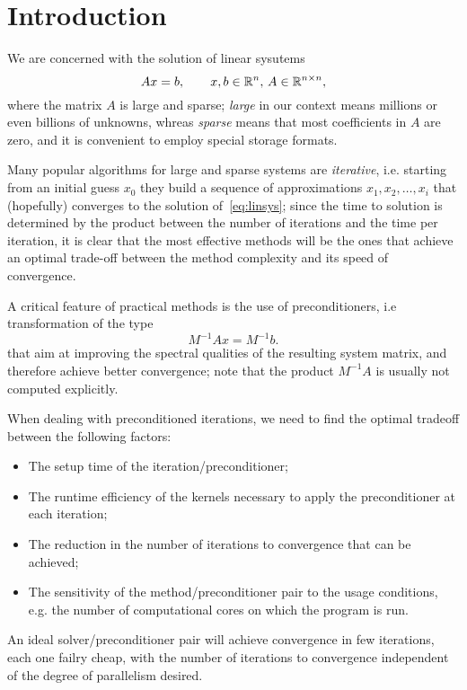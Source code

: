 \section{Introduction}


We are concerned with the solution of linear sysutems 
 \begin{equation}
 Ax = b, \qquad x,b \in \Bbb{R}^n,\, A\in \Bbb{R}^{n\times n},
\label{eq:linsys}
\end{equation}
where the matrix $A$ is large and sparse;  \emph{large}  in our
context means millions or even billions of unknowns, whreas
\emph{sparse} means that most coefficients in $A$ are zero, and it is
convenient to employ special storage formats. 

Many popular algorithms for large and sparse systems are
\emph{iterative}, i.e. starting from an initial guess $x_0$ they build
a sequence of approximations  $x_1,x_2,\dots,x_i$ that (hopefully)
converges to the solution of~\ref{eq:linsys}; since the time to
solution is determined by the product between the number of iterations
and the time per iteration, it is clear that the most effective
methods will be the ones that achieve an optimal trade-off between the
method complexity and its speed of convergence. 

A critical feature of practical methods is the use of preconditioners,
i.e transformation of the type 
\begin{equation}\label{eq:preclinsys}
M^{-1}Ax=M^{-1}b.
\end{equation} 
that aim at improving the spectral qualities of the resulting system
matrix, and therefore achieve better convergence; note that the
product $M^{-1}A$ is usually  not computed explicitly. 

When dealing with preconditioned iterations, we need to find the
optimal tradeoff between the following factors:
\begin{itemize}
\item The setup time of the iteration/preconditioner;
\item The runtime  efficiency of the kernels necessary to apply the 
  preconditioner at each iteration; 
\item The reduction in the number of iterations to convergence that
  can be achieved;
\item The sensitivity of the method/preconditioner pair to the usage
  conditions, e.g. the number of computational cores on which the
  program is run. 
\end{itemize}
An ideal solver/preconditioner pair will achieve convergence in few
iterations, each one failry cheap, with the number of iterations to
convergence independent of the degree of parallelism desired. 

